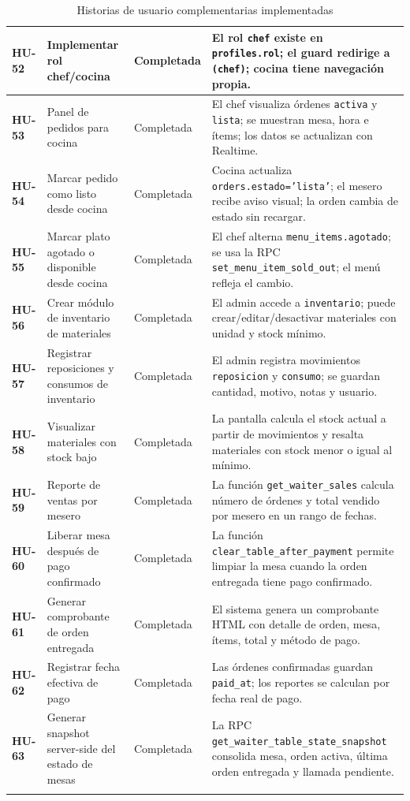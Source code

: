\begin{longtable}{|>{\bfseries}p{1.5cm}|p{5.2cm}|p{2.2cm}|p{5cm}|}
HU-52 & Implementar rol chef/cocina & Completada & El rol \texttt{chef} existe en \texttt{profiles.rol}; el guard redirige a \texttt{(chef)}; cocina tiene navegación propia. \\
\hline
HU-53 & Panel de pedidos para cocina & Completada & El chef visualiza órdenes \texttt{activa} y \texttt{lista}; se muestran mesa, hora e ítems; los datos se actualizan con Realtime. \\
\hline
HU-54 & Marcar pedido como listo desde cocina & Completada & Cocina actualiza \texttt{orders.estado='lista'}; el mesero recibe aviso visual; la orden cambia de estado sin recargar. \\
\hline
HU-55 & Marcar plato agotado o disponible desde cocina & Completada & El chef alterna \texttt{menu\_items.agotado}; se usa la RPC \texttt{set\_menu\_item\_sold\_out}; el menú refleja el cambio. \\
\hline
HU-56 & Crear módulo de inventario de materiales & Completada & El admin accede a \texttt{inventario}; puede crear/editar/desactivar materiales con unidad y stock mínimo. \\
\hline
HU-57 & Registrar reposiciones y consumos de inventario & Completada & El admin registra movimientos \texttt{reposicion} y \texttt{consumo}; se guardan cantidad, motivo, notas y usuario. \\
\hline
HU-58 & Visualizar materiales con stock bajo & Completada & La pantalla calcula el stock actual a partir de movimientos y resalta materiales con stock menor o igual al mínimo. \\
\hline
HU-59 & Reporte de ventas por mesero & Completada & La función \texttt{get\_waiter\_sales} calcula número de órdenes y total vendido por mesero en un rango de fechas. \\
\hline
HU-60 & Liberar mesa después de pago confirmado & Completada & La función \texttt{clear\_table\_after\_payment} permite limpiar la mesa cuando la orden entregada tiene pago confirmado. \\
\hline
HU-61 & Generar comprobante de orden entregada & Completada & El sistema genera un comprobante HTML con detalle de orden, mesa, ítems, total y método de pago. \\
\hline
HU-62 & Registrar fecha efectiva de pago & Completada & Las órdenes confirmadas guardan \texttt{paid\_at}; los reportes se calculan por fecha real de pago. \\
\hline
HU-63 & Generar snapshot server-side del estado de mesas & Completada & La RPC \texttt{get\_waiter\_table\_state\_snapshot} consolida mesa, orden activa, última orden entregada y llamada pendiente. \\
\hline
\caption{Historias de usuario complementarias implementadas}
\end{longtable}
